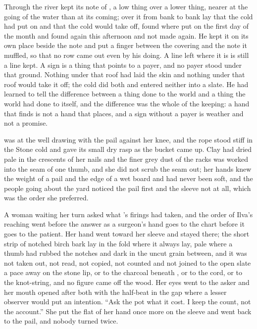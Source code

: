 Through  the river kept its note of , a low thing over a lower thing, nearer at the going of the water than at its coming; over it from bank to bank lay  that the cold had put on and that the cold would take off, found where put on the first day of the month and found again this afternoon and not made again. He kept it on its own place beside the note and put a finger between the covering and the note it muffled, so that no row came out even by his doing. A line left where it is is still a line kept. A sign is a thing that points to a payer, and no payer stood under that ground. Nothing under that roof had laid the skin and nothing under that roof would take it off; the cold did both and entered neither into a slate. He had learned to tell the difference between a thing done to the world and a thing the world had done to itself, and the difference was the whole of the keeping: a hand that finds is not a hand that places, and a sign without a payer is weather and not a promise.

\scenebreak

 was at the well drawing with the pail against her knee, and the rope stood stiff in the Stone cold and gave its small dry rasp as the bucket came up. Clay had dried pale in the crescents of her nails and the finer grey dust of the racks was worked into the seam of one thumb, and she did not scrub the seam out; her hands knew the weight of a pail and the edge of a wet board and had never been soft, and the people going about the yard noticed the pail first and the sleeve not at all, which was the order she preferred.

A woman waiting her turn asked what 's firings had taken, and the order of Ilva's reaching went before the answer as a surgeon's hand goes to the chart before it goes to the patient. Her hand went toward her sleeve and stayed there; the short strip of notched birch bark lay in the fold where it always lay, pale where a thumb had rubbed the notches and dark in the uncut grain between, and it was not taken out, not read, not copied, not counted and not joined to the open slate a pace away on the stone lip, or to the charcoal beneath , or to the cord, or to the knot-string, and no figure came off the wood. Her eyes went to the asker and her mouth opened after both with the half-beat in the gap where a lesser observer would put an intention. “Ask the pot what it cost. I keep the count, not the account.” She put the flat of her hand once more on the sleeve and went back to the pail, and nobody turned twice.

